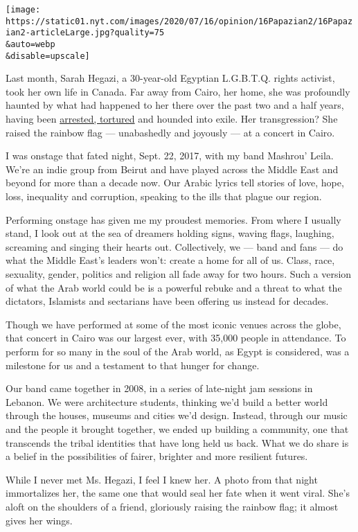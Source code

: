 \texttt{[image: https://static01.nyt.com/images/2020/07/16/opinion/16Papazian2/16Papazian2-articleLarge.jpg?quality=75\\\&auto=webp\\\&disable=upscale]}

Last month, Sarah Hegazi, a 30-year-old Egyptian L.G.B.T.Q. rights
activist, took her own life in Canada. Far away from Cairo, her home,
she was profoundly haunted by what had happened to her there over the
past two and a half years, having been
\href{https://www.nytimes.com/2020/06/15/world/middleeast/egypt-gay-suicide-sarah-hegazi.html}{arrested,
tortured} and hounded into exile. Her transgression? She raised the
rainbow flag --- unabashedly and joyously --- at a concert in Cairo.

I was onstage that fated night, Sept. 22, 2017, with my band Mashrou'
Leila. We're an indie group from Beirut and have played across the
Middle East and beyond for more than a decade now. Our Arabic lyrics
tell stories of love, hope, loss, inequality and corruption, speaking to
the ills that plague our region.

Performing onstage has given me my proudest memories. From where I
usually stand, I look out at the sea of dreamers holding signs, waving
flags, laughing, screaming and singing their hearts out. Collectively,
we --- band and fans --- do what the Middle East's leaders won't: create
a home for all of us. Class, race, sexuality, gender, politics and
religion all fade away for two hours. Such a version of what the Arab
world could be is a powerful rebuke and a threat to what the dictators,
Islamists and sectarians have been offering us instead for decades.

Though we have performed at some of the most iconic venues across the
globe, that concert in Cairo was our largest ever, with 35,000 people in
attendance. To perform for so many in the soul of the Arab world, as
Egypt is considered, was a milestone for us and a testament to that
hunger for change.

Our band came together in 2008, in a series of late-night jam sessions
in Lebanon. We were architecture students, thinking we'd build a better
world through the houses, museums and cities we'd design. Instead,
through our music and the people it brought together, we ended up
building a community, one that transcends the tribal identities that
have long held us back. What we do share is a belief in the
possibilities of fairer, brighter and more resilient futures.

While I never met Ms. Hegazi, I feel I knew her. A photo from that night
immortalizes her, the same one that would seal her fate when it went
viral. She's aloft on the shoulders of a friend, gloriously raising the
rainbow flag; it almost gives her wings.

